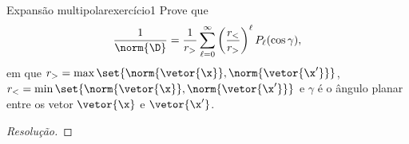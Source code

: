 \begin{exercício}{Expansão multipolar}{exercício1}
    Prove que
    \begin{equation*}
        \frac{1}{\norm{\D}} = \frac{1}{r_>} \sum_{\ell = 0}^\infty \left(\frac{r_<}{r_>}\right)^\ell P_\ell(\cos \gamma),
    \end{equation*}
    em que \(r_> = \max\set{\norm{\vetor{\x}}, \norm{\vetor{\x'}}}\), \(r_< = \min\set{\norm{\vetor{\x}}, \norm{\vetor{\x'}}}\) e \(\gamma\) é o ângulo planar entre os vetor \(\vetor{\x}\) e \(\vetor{\x'}\).
\end{exercício}
\begin{proof}[Resolução]

\end{proof}
